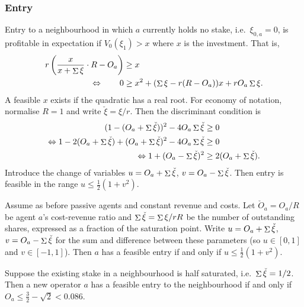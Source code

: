 \subsubsection{Entry}
%
Entry to a neighbourhood in which $a$ currently holds no stake, i.e.~$\xi_{0,a}=0$, is profitable in expectation if $V_0(\xi_1) > x$ where $x$ is the investment.
%
That is,
\begin{align*}
  r\left(\frac{x}{x+\mathop{\Sigma}{\xi}} \cdot R - O_a \right) &\geq  x \\
  \Leftrightarrow \qquad  0 &\geq x^2 + (\mathop{\Sigma}\xi - r(R-O_a))x + rO_a\mathop{\Sigma}\xi .
\end{align*}
A feasible $x$ exists if the quadratic has a real root.
%
For economy of notation, normalise $R=1$ and write $\check{\xi}=\xi/r$.
%
Then the discriminant condition is 
\begin{align*}
  (1 - (O_a + \mathop{\Sigma}\check\xi) )^2 - 4O_a\mathop{\Sigma}\check\xi &\geq 0 \\
  \Leftrightarrow 1 - 2(O_a + \mathop{\Sigma}\check\xi) + (O_a + \mathop{\Sigma}\check\xi)^2 - 4O_a\mathop{\Sigma}\check\xi &\geq 0 \\
  \Leftrightarrow 1 + (O_a - \mathop{\Sigma}\check\xi)^2 &\geq 2(O_a + \mathop{\Sigma}\check\xi).
\end{align*}
Introduce the change of variables $u=O_a+\mathop{\Sigma}\check\xi$, $v=O_a - \mathop{\Sigma}\check\xi$.
%
Then entry is feasible in the range $u \leq \frac{1}{2}(1+v^2)$.
%

\begin{proposition*}

  Assume as before passive agents and constant revenue and costs.
  Let $\check{O}_a= O_a/R$ be agent $a$'s cost-revenue ratio and $\mathop{\Sigma}\check\xi = \mathop{\Sigma}\xi/rR$ be the number of outstanding shares, expressed as a fraction of the saturation point.
  Write $u=O_a+\mathop{\Sigma}\check\xi$, $v=O_a - \mathop{\Sigma}\check\xi$ for the sum and difference between these parameters (so $u\in[0,1]$ and $v\in[-1,1]$).
  Then $a$ has a feasible entry if and only if $u \leq \frac{1}{2}(1+v^2)$.

\end{proposition*}

\begin{corollary*}

  Suppose the existing stake in a neighbourhood is half saturated, i.e.~$\mathop{\Sigma}\check\xi=1/2$.
  Then a new operator $a$ has a feasible entry to the neighbourhood if and only if $O_a\leq \frac{3}{2}-\sqrt{2}< 0.086$.

\end{corollary*}

